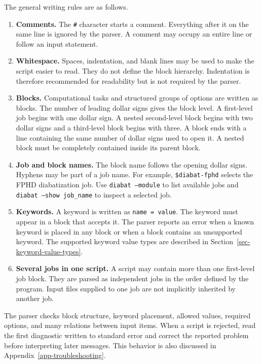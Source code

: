 The general writing rules are as follows.
\begin{enumerate}
\item \textbf{Comments.} The \texttt{\#} character starts a comment. Everything after it on the same line is ignored by the parser. A comment may occupy an entire line or follow an input statement.
\item \textbf{Whitespace.} Spaces, indentation, and blank lines may be used to make the script easier to read. They do not define the block hierarchy. Indentation is therefore recommended for readability but is not required by the parser.
\item \textbf{Blocks.} Computational tasks and structured groups of options are written as blocks. The number of leading dollar signs gives the block level. A first-level job begins with one dollar sign. A nested second-level block begins with two dollar signs and a third-level block begins with three. A block ends with a line containing the same number of dollar signs used to open it. A nested block must be completely contained inside its parent block.
\item \textbf{Job and block names.} The block name follows the opening dollar signs. Hyphens may be part of a job name. For example, \texttt{\$diabat-fphd} selects the FPHD diabatization job. Use \texttt{diabat --module} to list available jobs and \texttt{diabat --show job\_name} to inspect a selected job.
\item \textbf{Keywords.}
A keyword is written as \texttt{name = value}. The keyword must appear in a block that accepts it. The parser reports an error when a known keyword is  placed in any block or when a block contains an unsupported keyword. The supported keyword value types are described in Section~\ref{sec-keyword-value-types}.
\item \textbf{Several jobs in one script.} A script may contain more than one first-level job block. They are parsed as independent jobs in the order defined by the program. Input files supplied to one job are not implicitly inherited by another job.
\end{enumerate}

The parser checks block structure, keyword placement, allowed values, required options, and many relations between input items. When a script is rejected, read the first diagnostic written to standard error and correct the reported problem before interpreting later messages. This behavior is also discussed in Appendix~\ref{app-troubleshooting}.
